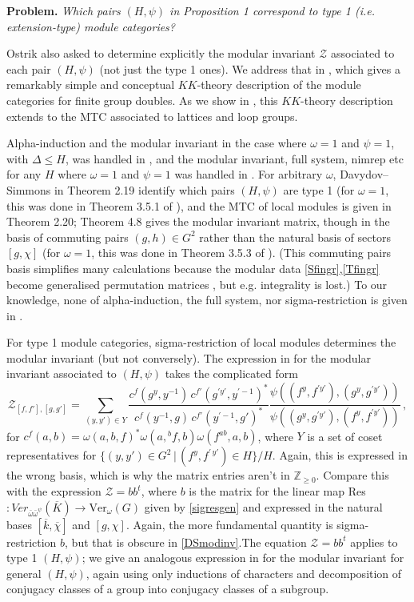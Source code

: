 \documentclass[12pt]{article}
\numberwithin{equation}{section}
\def\cZ            {{\mathcal{Z}}}
\def\bbZ           {\mathbb{Z}}
\begin{document}
\medskip\noindent\textbf{Problem.} \textit{Which pairs {$(H,\psi)$ in Proposition 1 correspond to type 1 (i.e. extension-type)
module categories}?} \medskip


Ostrik also asked to determine explicitly the modular invariant $\cZ$ associated to
each pair $(H,\psi)$ (not just the type 1 ones). We address that in \cite{EG8}, which gives a remarkably simple and conceptual $KK$-theory description of the module categories for finite group doubles. As we show in \cite{EG7}, this $KK$-theory description extends to the MTC associated to lattices and loop groups.


Alpha-induction and the modular invariant in the case where $\omega=1$ and $\psi = 1$, with $\Delta \le H$, was handled in
\cite{Ev}, and the modular invariant, full system, nimrep etc for any $H$ where $\omega =1$ and $\psi = 1$ was handled in \cite{EG3}. For arbitrary $\omega$, Davydov--Simmons \cite{Dav3} in Theorem 2.19 identify which pairs $(H,\psi)$ are type 1 (for $\omega=1$, this was done in Theorem 3.5.1 of   \cite{Dav}), and the MTC of local modules is given in Theorem 2.20; Theorem 4.8 gives the modular
invariant matrix, though in the basis of commuting pairs $(g,h)\in G^2$ rather than the natural basis of sectors $[g,\chi]$ (for $\omega=1$, this was done in Theorem 3.5.3 of \cite{Dav}). (This commuting pairs basis simplifies many calculations because the modular data \eqref{Sfingr},\eqref{Tfingr} become generalised permutation matrices \cite{Bnt}, but e.g. integrality is lost.)
 To our knowledge, none of alpha-induction, the full system, nor sigma-restriction is given in \cite{Dav3,Dav}.




For type 1 module categories,  sigma-restriction of local modules determines the modular invariant (but not conversely). The expression in \cite{Dav3} for the modular
 invariant associated to  $(H,\psi)$ takes the complicated  form
\begin{equation}\cZ_{[f,f'],[g,g']}=\sum_{(y,y')\in Y}\frac{c^f(g^y,y^{-1})\,c^{f'}(g^{\prime y'},y^{\prime-1})^*}{c^f(y^{-1},g)\,c^{f'}(y^{\prime-1},g')^*}\frac{\psi((f^y,f^{\prime y'}),(g^y,g^{\prime y'}))}{\psi((g^y,g^{\prime y'}),(f^y,f^{\prime y'}))}\,,\label{DSmodinv}\end{equation}
 for $c^f(a,b)=\omega(a,b,f)^*\omega(a,{}^bf,b)\omega(f^{ab},a,b)$, where $Y$ is a set of coset representatives for $\{(y,y')\in G^2\,|\,(f^y,f^{\prime\,y'})\in H\}/H$. Again, this is expressed in the wrong basis, which is why the matrix entries aren't in $\bbZ_{\ge 0}$. Compare this with the expression $\cZ=bb^t$, where $b$ is the matrix for the linear map Res$:Ver_{\bar{\omega}\bar{\omega}^\psi}(\overline{K})\rightarrow \mathrm{Ver}_\omega(G)$ given by \eqref{sigresgen} and expressed in the natural bases $[\overline{k},\overline{\chi}]$ and $[g,\chi]$. 
Again, the more fundamental quantity is sigma-restriction $b$, but that is obscure in \eqref{DSmodinv}.The equation $\cZ=bb^t$ applies to type 1 $(H,\psi)$; we give an
analogous expression in \cite{EG8}  for the modular invariant for general $(H,\psi)$, again using only inductions of characters and decomposition of conjugacy classes of a group into conjugacy classes of a subgroup. 
 
\end{document}
